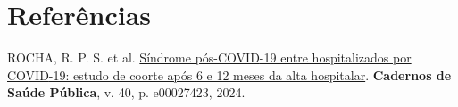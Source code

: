 \documentclass[
  portuguese,
  letterpaper,
  DIV=11,
  numbers=noendperiod]{scrarticle}
\newlength{\cslhangindent}
\newenvironment{CSLReferences}[2] %
 {\begin{list}{}{%
  \setlength{\itemindent}{0pt}
  \setlength{\leftmargin}{0pt}
  \setlength{\parsep}{0pt}
  \ifodd #1
   \setlength{\leftmargin}{\cslhangindent}
   \setlength{\itemindent}{-1\cslhangindent}
  \fi
  \setlength{\itemsep}{#2\baselineskip}}}
 {\end{list}}
\begin{document}
\section{Referências}\label{referuxeancias}

\label{refs}
\begin{CSLReferences}{0}{1}
ROCHA, R. P. S. et al.
\href{https://doi.org/10.1590/0102-311XPT027423}{Síndrome pós-{COVID}-19
entre hospitalizados por {COVID}-19: estudo de coorte após 6 e 12 meses
da alta hospitalar}. \textbf{Cadernos de Saúde Pública}, v. 40, p.
e00027423, 2024.

\end{CSLReferences}
\end{document}
